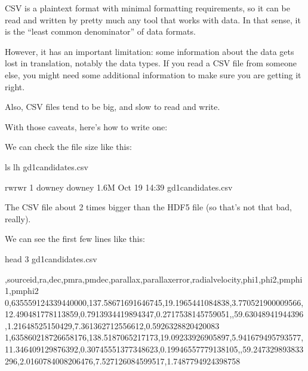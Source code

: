 \documentclass[letterpaper,10pt,english]{sphinxmanual}
\begin{document}
CSV is a plain\sphinxhyphen{}text format with minimal formatting requirements, so it can be read and written by pretty much any tool that works with data.  In that sense, it is the “least common denominator” of data formats.

However, it has an important limitation: some information about the data gets lost in translation, notably the data types.  If you read a CSV file from someone else, you might need some additional information to make sure you are getting it right.

Also, CSV files tend to be big, and slow to read and write.

With those caveats, here’s how to write one:

\begin{sphinxVerbatim}[commandchars=\\\{\}]
\end{sphinxVerbatim}

We can check the file size like this:

\begin{sphinxVerbatim}[commandchars=\\\{\}]
ls \PYGZhy{}lh gd1\PYGZus{}candidates.csv
\end{sphinxVerbatim}

\begin{sphinxVerbatim}[commandchars=\\\{\}]
\PYGZhy{}rw\PYGZhy{}rw\PYGZhy{}r\PYGZhy{}\PYGZhy{} 1 downey downey 1.6M Oct 19 14:39 gd1\PYGZus{}candidates.csv
\end{sphinxVerbatim}

The CSV file about 2 times bigger than the HDF5 file (so that’s not that bad, really).

We can see the first few lines like this:

\begin{sphinxVerbatim}[commandchars=\\\{\}]
head \PYGZhy{}3 gd1\PYGZus{}candidates.csv
\end{sphinxVerbatim}

\begin{sphinxVerbatim}[commandchars=\\\{\}]
,source\PYGZus{}id,ra,dec,pmra,pmdec,parallax,parallax\PYGZus{}error,radial\PYGZus{}velocity,phi1,phi2,pm\PYGZus{}phi1,pm\PYGZus{}phi2
0,635559124339440000,137.58671691646745,19.1965441084838,\PYGZhy{}3.770521900009566,\PYGZhy{}12.490481778113859,0.7913934419894347,0.2717538145759051,,\PYGZhy{}59.63048941944396,\PYGZhy{}1.21648525150429,\PYGZhy{}7.361362712556612,\PYGZhy{}0.5926328820420083
1,635860218726658176,138.5187065217173,19.09233926905897,\PYGZhy{}5.941679495793577,\PYGZhy{}11.346409129876392,0.30745551377348623,0.19946557779138105,,\PYGZhy{}59.247329893833296,\PYGZhy{}2.0160784008206476,\PYGZhy{}7.527126084599517,1.7487794924398758
\end{sphinxVerbatim}
\end{document}
